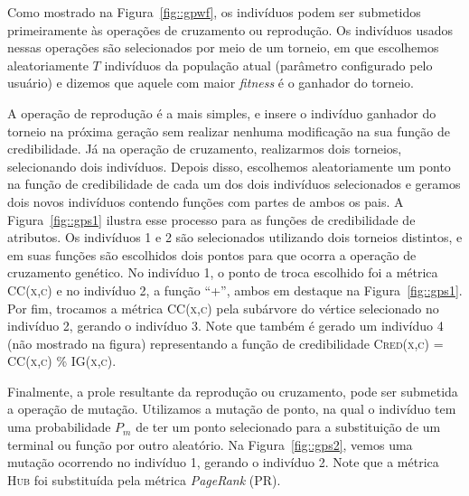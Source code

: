 Como mostrado na Figura~\ref{fig::gpwf}, os indivíduos podem ser submetidos primeiramente às operações de cruzamento ou reprodução. 
Os indivíduos usados nessas operações são selecionados por meio de um torneio, em que escolhemos aleatoriamente $T$ indivíduos da população atual (parâmetro configurado pelo usuário) e dizemos que aquele com maior \textit{fitness} é o ganhador do torneio. 

A operação de reprodução é a mais simples, e insere o indivíduo ganhador do torneio na próxima geração sem realizar nenhuma modificação na sua função de credibilidade. Já na operação de cruzamento, realizarmos dois torneios, selecionando dois indivíduos. 
Depois disso, escolhemos aleatoriamente um ponto na função de credibilidade de cada um dos dois indivíduos selecionados e geramos dois novos indivíduos contendo funções com partes de ambos os pais. A Figura~\ref{fig::gps1} ilustra esse processo para as funções de credibilidade de atributos. 
Os indivíduos 1 e 2 são selecionados utilizando dois torneios distintos, e em suas funções são escolhidos dois pontos para que ocorra a operação de cruzamento genético. 
No indivíduo 1, o ponto de troca escolhido foi a métrica 
\textsc{CC(x,c)} 
e no indivíduo 2, a função ``+'', ambos em destaque na Figura~\ref{fig::gps1}.
Por fim, trocamos a métrica \textsc{CC(x,c)} pela subárvore do vértice selecionado no indivíduo 2, gerando o indivíduo 3. 
Note que também é gerado um indivíduo 4 (não mostrado na figura) representando a função de credibilidade \textsc{Cred(x,c) = CC(x,c) \% IG(x,c)}. 

Finalmente, a prole resultante da reprodução ou cruzamento, pode ser submetida a operação de mutação. Utilizamos a mutação de ponto, na qual o indivíduo tem uma probabilidade $P_m$ de ter um ponto selecionado para a substituição de um terminal ou função por outro aleatório.
Na Figura~\ref{fig::gps2}, vemos uma mutação ocorrendo no indivíduo 1, gerando o indivíduo 2. Note que a métrica \textsc{Hub} foi substituída pela métrica \textit{PageRank} (\textsc{PR}).

